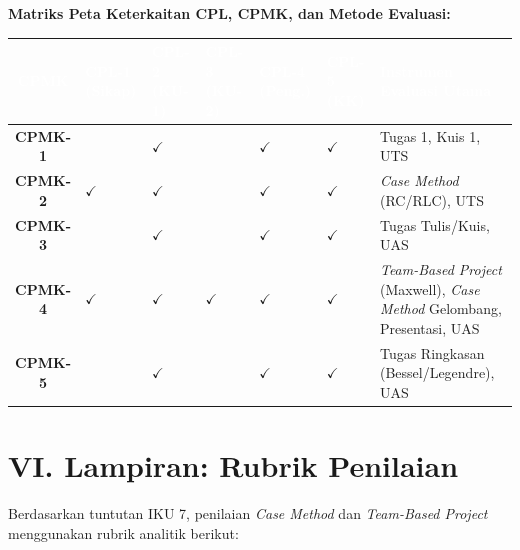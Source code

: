 \documentclass[11pt,a4paper]{article}
\begin{document}
\vspace{0.3cm}
\noindent\textbf{Matriks Peta Keterkaitan CPL, CPMK, dan Metode Evaluasi:}
\begin{table}[h]
\centering
\begin{tabularx}{\textwidth}{|c|C{1.5cm}|C{1.5cm}|C{1.5cm}|C{1.5cm}|C{1.5cm}|X|}
\hline
{}
\textcolor{white}{\textbf{CPMK}} & \textcolor{white}{\textbf{CPL-1 (Sikap)}} & \textcolor{white}{\textbf{CPL-2 (KU-1)}} & \textcolor{white}{\textbf{CPL-3 (KU-2)}} & \textcolor{white}{\textbf{CPL-4 (Peng.)}} & \textcolor{white}{\textbf{CPL-5 (KK)}} & \textcolor{white}{\textbf{Instrumen Evaluasi Utama}} \\ \hline
\textbf{CPMK-1} & & $\checkmark$ & & $\checkmark$ & $\checkmark$ & Tugas 1, Kuis 1, UTS \\ \hline
\textbf{CPMK-2} & $\checkmark$ & $\checkmark$ & & $\checkmark$ & $\checkmark$ & \textit{Case Method} (RC/RLC), UTS \\ \hline
\textbf{CPMK-3} & & $\checkmark$ & & $\checkmark$ & $\checkmark$ & Tugas Tulis/Kuis, UAS \\ \hline
\textbf{CPMK-4} & $\checkmark$ & $\checkmark$ & $\checkmark$ & $\checkmark$ & $\checkmark$ & \textit{Team-Based Project} (Maxwell), \textit{Case Method} Gelombang, Presentasi, UAS \\ \hline
\textbf{CPMK-5} & & $\checkmark$ & & $\checkmark$ & $\checkmark$ & Tugas Ringkasan (Bessel/Legendre), UAS \\ \hline
\end{tabularx}
\end{table}

\newpage
\section*{VI. Lampiran: Rubrik Penilaian}

Berdasarkan tuntutan IKU 7, penilaian \textit{Case Method} dan \textit{Team-Based Project} menggunakan rubrik analitik berikut:
\end{document}
